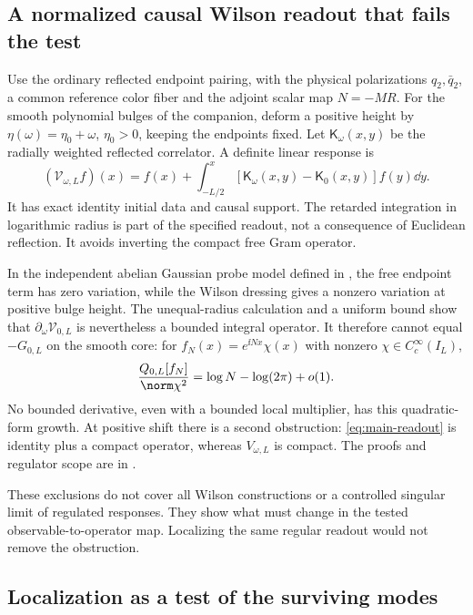 \subsection{A normalized causal Wilson readout that fails the test}

Use the ordinary reflected endpoint pairing, with the physical
polarizations $q_2,\bar q_2$, a common reference color fiber and
the adjoint scalar map $N=-MR$. For the smooth polynomial bulges
of the companion, deform a positive height by
$\eta(\omega)=\eta_0+\omega$, $\eta_0>0$, keeping the endpoints
fixed. Let $\mathsf K_\omega(x,y)$ be the radially weighted
reflected correlator. A definite linear response is
\begin{equation}\label{eq:main-readout}
 (\mathcal V_{\omega,L}f)(x)=f(x)+
 \int_{-L/2}^{x}
 [\mathsf K_\omega(x,y)-\mathsf K_0(x,y)]f(y)\dd y.
\end{equation}
It has exact identity initial data and causal support. The
retarded integration in logarithmic radius is part of the
specified readout, not a consequence of Euclidean reflection.
It avoids inverting the compact free Gram operator.

In the independent abelian Gaussian probe model defined in
\cite[Sections~S10.3--S10.4]{Supplement}, the free endpoint term
has zero variation, while the Wilson dressing gives a nonzero
variation at positive bulge height. The unequal-radius
calculation and a uniform bound show that
$\partial_\omega\mathcal V_{0,L}$ is nevertheless a bounded
integral operator. It therefore cannot equal $-G_{0,L}$ on the
smooth core: for $f_N(x)=e^{\ii Nx}\chi(x)$ with nonzero
$\chi\in C_c^\infty(I_L)$,
\[
 \frac{Q_{0,L}[f_N]}{\norm\chi^2}
 =\log N-\log(2\pi)+o(1).
\]
No bounded derivative, even with a bounded local multiplier,
has this quadratic-form growth. At positive shift there is a
second obstruction: \eqref{eq:main-readout} is identity plus a
compact operator, whereas $V_{\omega,L}$ is compact.
The proofs and regulator scope are in
\cite[Section~S10.5]{Supplement}.

These exclusions do not cover all Wilson constructions or a
controlled singular limit of regulated responses. They show
what must change in the tested observable-to-operator map.
Localizing the same regular readout would not remove the
obstruction.

\subsection{Localization as a test of the surviving modes}

